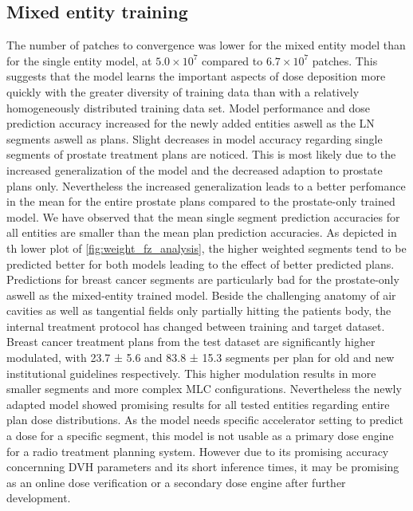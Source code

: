 \subsection{Mixed entity training}

The number of patches to convergence was lower for the mixed entity model than for the single entity model, at $5.0 \times 10^7$ compared to $6.7 \times 10^7$ patches.
This suggests that the model learns the important aspects of dose deposition more quickly with the greater diversity of training data than with a relatively homogeneously distributed training data set. 
Model performance and dose prediction accuracy increased for the newly added entities aswell as the \acs{LN} segments aswell as plans. 
Slight decreases in model accuracy regarding single segments of prostate treatment plans are noticed. 
This is most likely due to the increased generalization of the model and the decreased adaption to prostate plans only.
Nevertheless the increased generalization leads to a better perfomance in the mean for the entire prostate plans compared to the prostate-only trained model.
We have observed that the mean single segment prediction accuracies for all entities are smaller than the mean plan prediction accuracies.
As depicted in th lower plot of \autoref{fig:weight_fz_analysis}, the higher weighted segments tend to be predicted better for both models leading to the effect of better predicted plans.\\
Predictions for breast cancer segments are particularly bad for the prostate-only aswell as the mixed-entity trained model. 
Beside the challenging anatomy of air cavities as well as tangential fields only partially hitting the patients body, the internal treatment protocol has changed between training and target dataset. 
Breast cancer treatment plans from the test dataset are significantly higher modulated, with 23.7 ± 5.6 and 83.8 ± 15.3 segments per plan for old and new institutional guidelines respectively. 
This higher modulation results in more smaller segments and more complex \acs{MLC} configurations.
Nevertheless the newly adapted model showed promising results for all tested entities regarding entire plan dose distributions.
As the model needs specific accelerator setting to predict a dose for a specific segment, this model is not usable as a primary dose engine for a radio treatment planning system.
However due to its promising accuracy concernning DVH parameters and its short inference times, it may be promising as an online dose verification or a secondary dose engine after further development.


